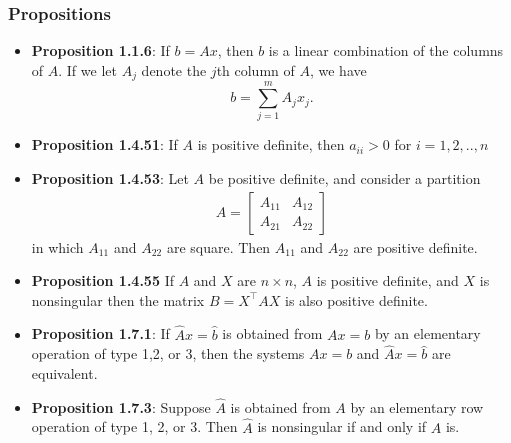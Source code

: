\documentclass{report}
\begin{document}
    \pagebreak \bigbreak \noindent 
    \subsubsection{Propositions}
    \begin{itemize}
        \item \textbf{Proposition 1.1.6}: If $b = Ax$, then $b$ is a linear combination of the columns of $A$.
            \bigbreak \noindent 
            If we let $A_{j}$ denote the $j$th column of $A$, we have
            \[
                b = \sum_{j=1}^{m} A_{j} x_{j}.
            \]
        \item \textbf{Proposition 1.4.51}: If $A$ is positive definite, then $a_{ii} > 0$ for $i = 1,2,..,n$
        \item  \textbf{Proposition 1.4.53}: Let $A$ be positive definite, and consider a partition
            \begin{align*}
                A = \begin{bmatrix} A_{11} & A_{12} \\ A_{21} & A_{22} \end{bmatrix}
            \end{align*}
            in which $A_{11}$ and $A_{22} $ are square. Then $A_{11}$ and $A_{22}$ are positive definite.
        \item \textbf{Proposition 1.4.55} If $A$ and $X$ are $n\times n$, $A$ is positive definite, and $X$ is nonsingular then the matrix $B = X^{\top}AX$ is also positive definite.
        \item \textbf{Proposition 1.7.1}: If $\hat{A}x = \hat{b}$ is obtained from $Ax = b$ by an elementary operation of type 1,2, or 3, then the systems $Ax = b$ and $\hat{A}x = \hat{b}$ are equivalent.
        \item \textbf{Proposition 1.7.3}:  Suppose $\hat{A}$ is obtained from $A$ by an elementary row operation of
            type 1, 2, or 3. Then $\hat{A}$ is nonsingular if and only if $A$ is.
    \end{itemize}

    \pagebreak \bigbreak \noindent 
\end{document}
